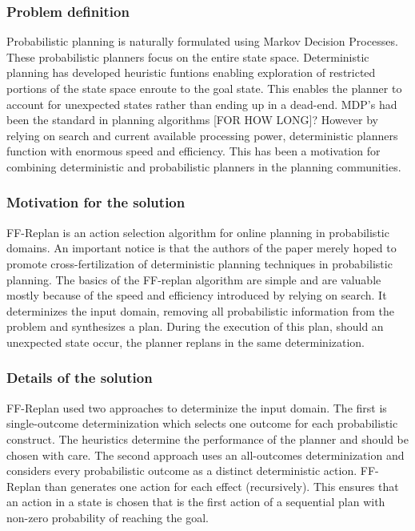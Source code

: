 \documentclass[runningheads,a4paper]{llncs}
\begin{document}
\subsubsection{Problem definition} 
Probabilistic planning is naturally formulated using Markov Decision Processes. These probabilistic planners focus on the entire state space. Deterministic planning has developed heuristic funtions enabling exploration of restricted portions of the state space enroute to the goal state. This enables the planner to account for unexpected states rather than ending up in a dead-end. MDP's had been the standard in planning algorithms [FOR HOW LONG]? However by relying on search and current available processing power, deterministic planners function with enormous speed and efficiency. This has been a motivation for combining deterministic and probabilistic planners in the planning communities. 

\subsubsection{Motivation for the solution}
FF-Replan is an action selection algorithm for online planning in probabilistic domains. An important notice is that the authors of the paper merely hoped to promote cross-fertilization of deterministic planning techniques in probabilistic planning. The basics of the FF-replan algorithm are simple and are valuable mostly because of the speed and efficiency introduced by relying on search.  It determinizes the input domain, removing all probabilistic information from the problem and synthesizes a plan. During the execution of this plan, should an unexpected state occur, the planner replans in the same determinization. 

\subsubsection{Details of the solution}
FF-Replan used two approaches to determinize the input domain. The first is single-outcome determinization which selects one outcome for each probabilistic construct. The heuristics determine the performance of the planner and should be chosen with care. The second approach uses an all-outcomes determinization and considers every probabilistic outcome as a distinct deterministic action. FF-Replan than generates one action for each effect (recursively). This ensures that an action in a state is chosen that is the first action of a sequential plan with non-zero probability of reaching the goal. 
\end{document}
